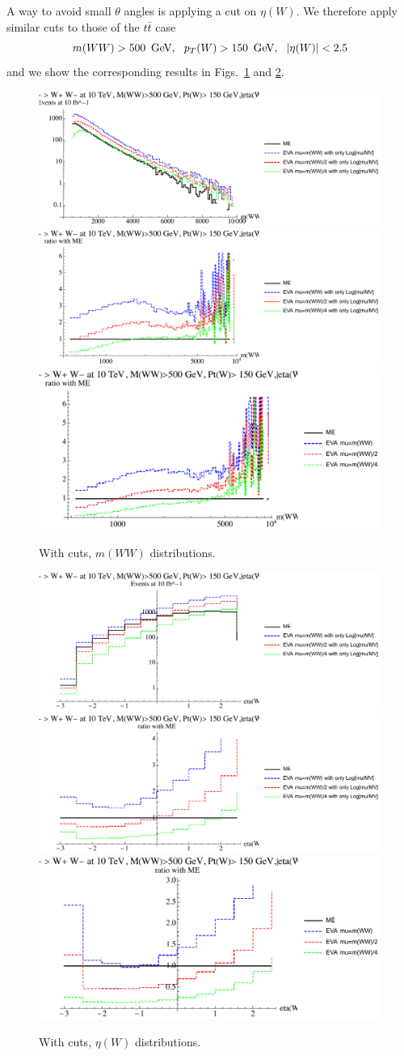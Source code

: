 \documentclass[a4paper,11pt]{article}
\begin{document}
A way to avoid small $\theta$ angles is applying a cut on $\eta(W)$. We therefore apply similar cuts to those of the $t \bar t$ case 
%
\begin{equation}
m(WW) > 500~\,\textrm{GeV}, ~~p_T(W) > 150~\,\textrm{GeV},~~ |\eta(W)|<2.5 
\end{equation}
 and we show the corresponding results in Figs.~\ref{fig:cutsWWWW} and \ref{fig:cutsWWWW2}.




\begin{figure}[!t]
\includegraphics[width=0.46\linewidth]{Notebooks/PlotDistr/WW_WW/10TeVcuts/plotmWW.pdf}
\includegraphics[width=0.46\linewidth]{Notebooks/PlotDistr/WW_WW/10TeVcuts/plotmWWratio1.pdf}
\includegraphics[width=0.46\linewidth]{Notebooks/PlotDistr/WW_WW/10TeVcuts/plotmWWratio2.pdf}
\caption{With cuts, $m(WW)$ distributions. \label{fig:cutsWWWW}}
\end{figure}



\begin{figure}[!t]
\includegraphics[width=0.46\linewidth]{Notebooks/PlotDistr/WW_WW/10TeVcuts/plotetaW.pdf}
\includegraphics[width=0.46\linewidth]{Notebooks/PlotDistr/WW_WW/10TeVcuts/plotetaWratio1.pdf}
\includegraphics[width=0.46\linewidth]{Notebooks/PlotDistr/WW_WW/10TeVcuts/plotetaWratio2.pdf}
\caption{With cuts, $\eta(W)$ distributions. \label{fig:cutsWWWW2}}
\end{figure}
\end{document}
